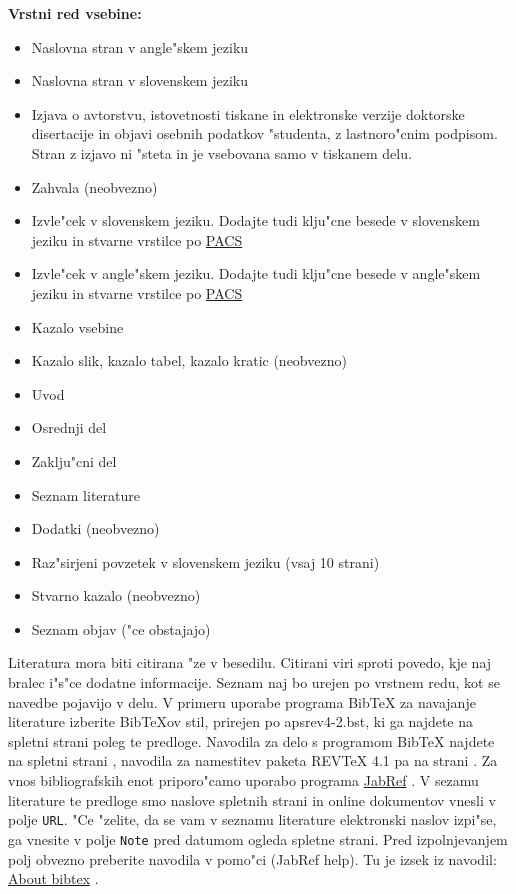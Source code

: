 {\bf Vrstni red vsebine:}

\begin{itemize}[noitemsep]
\item{Naslovna stran v angle"skem jeziku}
\item{Naslovna stran v slovenskem jeziku}
\item{Izjava o avtorstvu, istovetnosti tiskane in elektronske verzije doktorske diser\-tacije in objavi osebnih podatkov "studenta, z lastnoro"cnim podpisom.
Stran z izjavo ni "steta in je vsebovana samo v tiskanem delu.}
\item{Zahvala (neobvezno)}
\item{Izvle"cek v slovenskem jeziku. Dodajte tudi klju"cne besede v slovenskem jeziku in stvarne vrstilce po  \href{http://physics.zju.edu.cn/pw/ymdm/file/pacs/pacs.html}{\ac{PACS}}}
\item{Izvle"cek v angle"skem jeziku. Dodajte tudi klju"cne besede v angle"skem jeziku in stvarne vrstilce po  \href{http://physics.zju.edu.cn/pw/ymdm/file/pacs/pacs.html}{\ac{PACS}}}
\item{Kazalo vsebine}
\item{Kazalo slik, kazalo tabel, kazalo kratic (neobvezno)}
\item{Uvod}
\item{Osrednji del}
\item{Zaklju"cni del}
\item{Seznam literature}
\item{Dodatki (neobvezno)}
\item{Raz"sirjeni povzetek v slovenskem jeziku (vsaj 10 strani)}
\item{Stvarno kazalo (neobvezno)}
\item{Seznam objav ("ce obstajajo)}
\end{itemize}

Literatura mora biti citirana "ze v besedilu. Citirani viri sproti povedo, kje naj bralec i"s"ce dodatne informacije. 
Seznam naj bo urejen po vrstnem redu, kot se navedbe pojavijo v delu. 
V primeru uporabe programa {Bib\TeX} za navajanje lite\-rature izberite Bib\TeX{ov} stil, prirejen po apsrev4-2.bst, ki ga najdete na spletni strani poleg te predloge. 
Navodila za delo s programom {Bib\TeX} najdete na spletni strani \cite{Bib}, navodila za namestitev paketa REVTeX 4.1 pa na strani \cite{Rev}. 
Za vnos bibliografskih enot priporo"camo uporabo programa \href{http://www.jabref.org/}{JabRef} \cite{JR}. 
V sezamu literature te predloge smo naslove spletnih strani in online dokumentov vnesli v polje {\tt URL}. "Ce "zelite, da se vam v seznamu literature elektronski naslov izpi"se,
ga vnesite v polje {\tt Note} pred datumom ogleda spletne strani.
Pred izpolnjevanjem polj obvezno preberite navodila v pomo"ci (JabRef help). Tu je izsek iz navodil: \href{https://help.jabref.org/en/Bibtex}{About bibtex} \cite{Help}.\\

